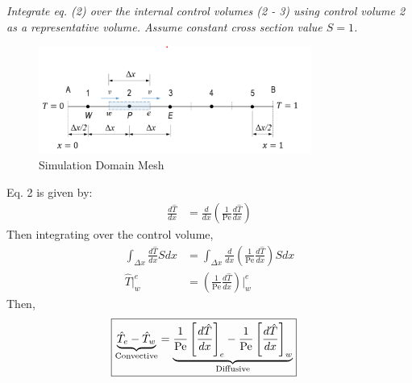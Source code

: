 \section{}
\textit{Integrate eq. (2) over the internal control volumes (2 - 3) using control volume 2 as a representative volume. Assume constant cross section value $S = 1$.}
\begin{figure}[H]
    \centering
    \includegraphics[width=0.8\textwidth]{Questions/Figures/Simulation Domain Mesh.png}
    \caption{Simulation Domain Mesh}
    \label{fig:mesh}
\end{figure}

Eq. 2 is given by:
\begin{align*}
    \frac{d \hat{T}}{dx} &= \frac{d}{dx}\left(\frac{1}{\text{Pe}}\frac{d \hat{T}}{dx}\right)
\end{align*}
Then integrating over the control volume,
\begin{align*}
    \int_{\Delta x} \frac{d \hat{T}}{dx} S dx &= \int_{\Delta x} \frac{d}{dx}\left(\frac{1}{\text{Pe}} \frac{d \hat{T}}{dx}\right) S dx \\
    \hat{T} \bigg|_{w}^{e} &= \left(\frac{1}{\text{Pe}} \frac{d \hat{T}}{dx}\right) \bigg|_{w}^{e} 
\end{align*}
Then,
\begin{align*}
    \Aboxed{\underbrace{\hat{T}_e - \hat{T}_w}_{\text{Convective}} &= \underbrace{\frac{1}{\text{Pe}} \left[\frac{d \hat{T}}{dx}\right]_e - \frac{1}{\text{Pe}} \left[\frac{d \hat{T}}{dx}\right]_w}_{\text{Diffusive}}}
\end{align*}

